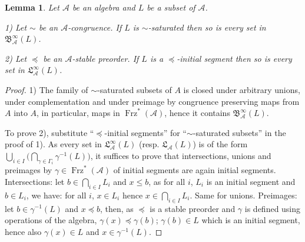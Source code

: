 \documentclass[11pt,a4paper]{article}
\newtheorem{lemma}[theorem]{Lemma}
\theoremstyle{definition} %
\newcommand\+[1]{\mathcal{#1}} %
\newcommand{\Bool}{{\mathfrak{B}}}   %
\newcommand{\Latt}{{\mathfrak{L}}}
\DeclareMathOperator{\freez}{Frz}%
\newcommand{\DUO}{{\freez}^*}
\begin{document}
%
\begin{lemma}\label{bool:saturated}
Let $\+A$ be an algebra and $L$ be a subset of $\+A$.

1) Let $\sim$ be an $\+A$-congruence.
If $L$ is $\sim$-saturated then so is every set in  $\Bool_{\+A}^\infty(L)$.

2) Let $\preceq$ be an $\+A$-stable preorder. 
If $L$ is a $\preceq$-initial segment then so is every set in  $\Latt_{\+A}^\infty(L)$.
\end{lemma}
%
\begin{proof}
 1) The family of $\sim$-saturated subsets of $A$
 is closed
 under arbitrary unions, under complementation
 and under preimage by congruence preserving maps 
 from $A$ into $A$, in particular, maps in $\freez^{*}(\+A)$, 
 hence it contains $\Bool_{\+A}^\infty(L)$.

To prove 2), substitute ``$\preceq$-initial segments''  for
 ``$\sim$-saturated subsets'' in the proof of 1).
 As every set in $\Latt_{\+A}^\infty(L)$ \big(resp. $\Latt_{\+A}(L)$\big)  is of the form
$\bigcup_{i\in I} \big(\bigcap_{\gamma\in \Gamma_i}\gamma^{-1}(L)\big)$, it suffices to prove that intersections, unions and preimages by $\gamma\in\DUO(\+A)$ of initial segments are again initial segments. 
Intersections:  let $b\in \bigcap_{i\in I} L_i$ and $x\leq b$, as for all $i$, $L_i$ is an initial segment and $b\in  L_i$, we have: for all $i$, $x\in  L_i$ hence $x\in\bigcap_{i\in I} L_i$.
Same for unions.
Preimages: let $b\in \gamma^{-1}(L)$ and $x\preceq b$, then, as $\preceq$ is a stable preorder and $\gamma$ is defined using operations of the algebra, $\gamma(x)\preceq \gamma(b)$; $ \gamma(b)\in L$ which is an initial segment, hence also $ \gamma(x)\in L$ and $x\in \gamma^{-1}(L)$.
\end{proof}
\end{document}
